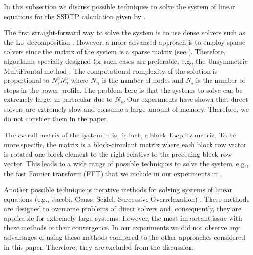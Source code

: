 In this subsection we discuss possible techniques to solve the system of linear equations for the SSDTP calculation given by .

The first straight-forward way to solve the system is to use dense solvers such as the LU decomposition \cite{press2007}. However, a more advanced approach is to employ sparse solvers since the matrix of the system is a sparse matrix (see ). Therefore, algorithms specially designed for such cases are preferable, e.g., the Unsymmetric MultiFrontal method \cite{umfpack2004}. The computational complexity of the solution is proportional to $N_s^3 N_n^3$ \cite{press2007} where $N_n$ is the number of nodes and $N_s$ is the number of steps in the power profile. The problem here is that the systems to solve can be extremely large, in particular due to $N_s$. Our experiments have shown that direct solvers are extremely slow and consume a large amount of memory. Therefore, we do not consider them in the paper.

The overall matrix of the system in  is, in fact, a block Toeplitz matrix. To be more specific, the matrix is a block-circulant matrix where each block row vector is rotated one block element to the right relative to the preceding block row vector. This leads to a wide range of possible techniques to solve the system, e.g., the fast Fourier transform (FFT) \cite{mazancourt1983} that we include in our experiments in .

Another possible technique is iterative methods for solving systems of linear equations (e.g., Jacobi, Gauss--Seidel, Successive Overrelaxation) \cite{press2007}. These methods are designed to overcome problems of direct solvers and, consequently, they are applicable for extremely large systems. However, the most important issue with these methods is their convergence. In our experiments we did not observe any advantages of using these methods compared to the other approaches considered in this paper. Therefore, they are excluded from the discussion.
